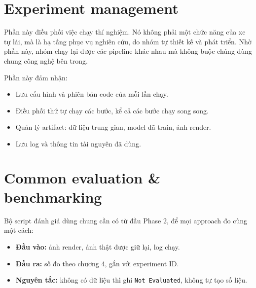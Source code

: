 \section{Experiment management}

Phần này điều phối việc chạy thí nghiệm. Nó không phải một chức năng của xe tự lái, mà là hạ tầng phục vụ nghiên cứu, do nhóm tự thiết kế và phát triển.
Nhờ phần này, nhóm chạy lại được các pipeline khác nhau mà không buộc chúng dùng chung công nghệ bên trong.

Phần này đảm nhận:
\begin{itemize}
  \item Lưu cấu hình và phiên bản code của mỗi lần chạy.
  \item Điều phối thứ tự chạy các bước, kể cả các bước chạy song song.
  \item Quản lý artifact: dữ liệu trung gian, model đã train, ảnh render.
  \item Lưu log và thông tin tài nguyên đã dùng.
\end{itemize}

\section{Common evaluation \& benchmarking}

Bộ script đánh giá dùng chung cần có từ đầu Phase 2, để mọi approach đo cùng một cách:
\begin{itemize}
  \item \textbf{Đầu vào:} ảnh render, ảnh thật được giữ lại, log chạy.
  \item \textbf{Đầu ra:} số đo theo chương 4, gắn với experiment ID.
  \item \textbf{Nguyên tắc:} không có dữ liệu thì ghi \texttt{Not Evaluated}, không tự tạo số liệu.
\end{itemize}
